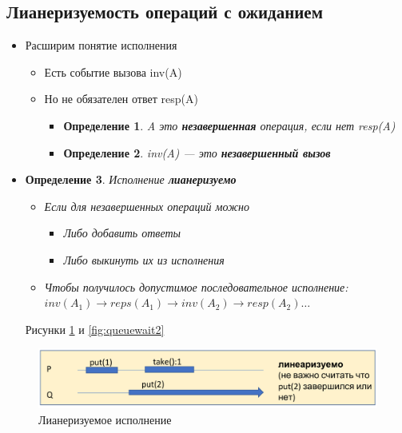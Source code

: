 \documentclass[10pt,a4paper,oneside,titlepage]{article}
\theoremstyle{plain}
\theoremstyle{defenition}
\newtheorem*{defenition}{Определение}
\begin{document}
\subsection{Лианеризуемость операций с ожиданием}
\begin{itemize}
	\item Расширим понятие исполнения
	\begin{itemize}
		\item Есть событие вызова inv(A)
		\item Но не обязателен ответ resp(A)
		\begin{itemize}
			\item\begin{defenition}
				A это {\bfseries незавершенная} операция, если нет resp(A)
			\end{defenition}
		    \item \begin{defenition}
		    	inv(A) --- это {\bfseries незавершенный вызов}
		    \end{defenition}
		\end{itemize}
	\end{itemize}
    \item \begin{defenition}
    	Исполнение {\bfseries лианеризуемо}
    	\begin{itemize}
    		\item Если для незавершенных операций можно
    		\begin{itemize}
    			\item Либо добавить ответы
    			\item Либо выкинуть их из исполнения
    	    \end{itemize}
            \item Чтобы получилось допустимое последовательное исполнение: $inv(A_1)\to reps(A_1)\to inv(A_2)\to resp(A_2)\ldots$
    	\end{itemize}
    \end{defenition}
    Рисунки \ref{fig:queuewait1} и \ref{fig:queuewait2}
\end{itemize}

\begin{figure}[h]
	\centering
	\includegraphics[width=0.4\linewidth]{pictures/QueueWait1}
	\caption{Лианеризуемое исполнение}
	\label{fig:queuewait1}
\end{figure}
\end{document}
